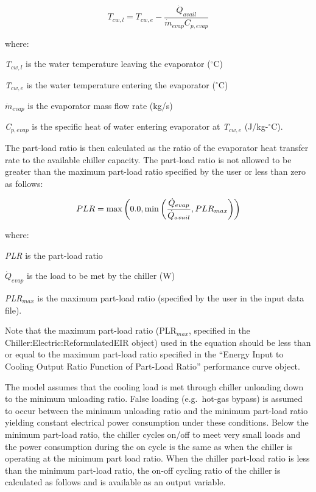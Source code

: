\begin{equation}
  T_{cw,l}  =  T_{cw,e} - \frac{\dot{Q}_{avail}}{\dot{m}_{evap}C_{p,evap}}
\end{equation}

where:

\emph{T\(_{cw,l}\)} is the water temperature leaving the evaporator (\(^{\circ}\)C)

\emph{T\(_{cw,e}\)} is the water temperature entering the evaporator (\(^{\circ}\)C)

\({\dot{m}_{evap}}\) is the evaporator mass flow rate (kg/s)

\emph{C\(_{p,evap}\)} is the specific heat of water entering evaporator at \emph{T\(_{cw,e}\)} (J/kg-\(^{\circ}\)C).

The part-load ratio is then calculated as the ratio of the evaporator heat transfer rate to the available chiller capacity. The part-load ratio is not allowed to be greater than the maximum part-load ratio specified by the user or less than zero as follows:

\begin{equation}
  PLR = \max\left(0.0,\min\left(\frac{\dot{Q}_{evap}}{\dot{Q}_{avail}},PLR_{max}\right)\right)
\end{equation}

where:

\emph{PLR} is the part-load ratio

\({\dot{Q}_{evap}}\) is the load to be met by the chiller (W)

\emph{PLR\(_{max}\)} is the maximum part-load ratio (specified by the user in the input data file).

Note that the maximum part-load ratio (PLR\(_{max}\), specified in the Chiller:Electric:ReformulatedEIR object) used in the equation should be less than or equal to the maximum part-load ratio specified in the ``Energy Input to Cooling Output Ratio Function of Part-Load Ratio'' performance curve object.

The model assumes that the cooling load is met through chiller unloading down to the minimum unloading ratio. False loading (e.g.~hot-gas bypass) is assumed to occur between the minimum unloading ratio and the minimum part-load ratio yielding constant electrical power consumption under these conditions. Below the minimum part-load ratio, the chiller cycles on/off to meet very small loads and the power consumption during the on cycle is the same as when the chiller is operating at the minimum part load ratio. When the chiller part-load ratio is less than the minimum part-load ratio, the on-off cycling ratio of the chiller is calculated as follows and is available as an output variable.

